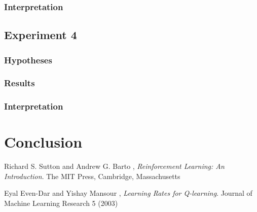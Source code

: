 \documentclass[11pt]{article}
\begin{document}
\subsubsection{Interpretation}


\subsubsection{}

\subsection{Experiment 4}

\subsubsection{Hypotheses}


\subsubsection{Results}


\subsubsection{Interpretation}


\subsubsection{}

\section{Conclusion}

\begin{thebibliography}{9}

  Richard S. Sutton and Andrew G. Barto ,
  \emph{Reinforcement Learning: An Introduction}.
  The MIT Press, Cambridge, Massachusetts

  Eyal Even-Dar and Yishay Mansour ,
  \emph{Learning Rates for Q-learning}.
  Journal of Machine Learning Research 5 (2003)

\end{thebibliography}
\end{document}

